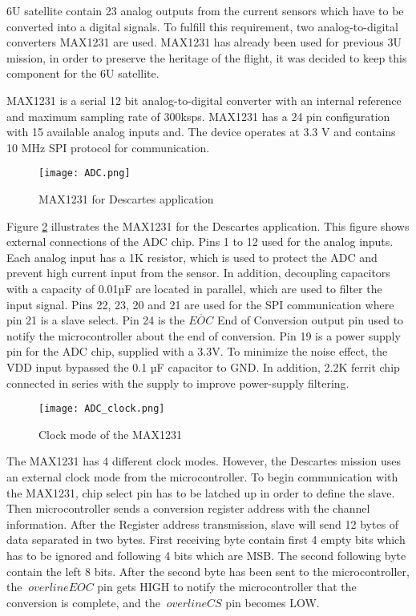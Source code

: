  6U satellite contain 23 analog outputs from the current sensors which have to be converted into a digital signals. To fulfill this requirement, two analog-to-digital converters MAX1231 are used. MAX1231 has already been used for previous 3U mission, in order to preserve the heritage of the flight, it was decided to keep this component for the 6U satellite.
 
  \cite{25}MAX1231 is a serial 12 bit  analog-to-digital converter with an internal reference and maximum sampling rate of 300ksps. MAX1231 has a 24 pin configuration with 15 available analog inputs and. The device operates at 3.3 V and contains 10 MHz SPI protocol for communication.
  
   \begin{figure}[h]
   	\centering
   	\texttt{[image: ADC.png]}
   	\caption{MAX1231 for Descartes application}
   	\label{fig: adc}
   \end{figure} 
 
  Figure \ref{fig: adc} illustrates the MAX1231 for the Descartes application. This figure shows external connections of the ADC chip. Pins 1 to 12 used for the analog inputs. Each analog input has a 1K resistor, which is used to protect the ADC and prevent high current input from the sensor. In addition, decoupling capacitors with a capacity of 0.01µF are located in parallel, which are used to filter the input signal. Pins 22, 23, 20 and 21 are used for the SPI communication where pin 21 is a slave select. Pin 24 is the $\overline{EOC}$ End of Conversion output pin used to notify the microcontroller about the end of conversion. Pin 19 is a power supply pin for the ADC chip, supplied with a 3.3V. To minimize the noise effect, the VDD input bypassed the 0.1 µF capacitor to GND. In addition, 2.2K ferrit chip connected in series with the supply to improve power-supply filtering. 
 
  \begin{figure}[h]
  	\centering
  	\texttt{[image: ADC\_clock.png]}
  	\caption{Clock mode of the MAX1231 \cite{25}}
  	\label{fig: adc}
  \end{figure} 
 
 The MAX1231 has 4 different clock modes. However, the Descartes mission uses an external clock mode from the microcontroller.  To begin communication with the MAX1231, chip select pin has to be latched up in order to define the slave. Then microcontroller sends a conversion register address with the channel information. After the Register address transmission, slave will send 12 bytes of data separated in two bytes. First receiving byte contain first 4 empty bits which has to be ignored and following 4 bits which are MSB. The second following byte contain the left 8 bits. After the second byte has been sent to the microcontroller, the $ \ overline {EOC} $ pin gets HIGH to notify the microcontroller that the conversion is complete, and the $ \ overline {CS} $ pin becomes LOW.

 
  
  